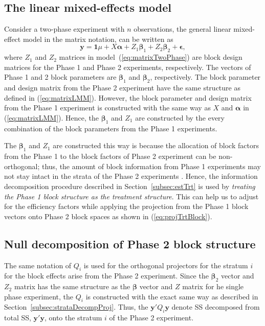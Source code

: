\documentclass[article]{jss}
\begin{document}
\subsection{The linear mixed-effects model}
\label{subsec:phase2Model}
Consider a two-phase experiment with $n$ observations, the general linear mixed-effect model in the matrix notation, can be written as
\begin{equation}
\label{eq:matrixTwoPhase}
\bm{y} = \bm{1}\mu + X\bm{\alpha} + Z_1\bm{\beta}_1 + Z_2\bm{\beta}_2 + \bm{\epsilon},
\end{equation}
where $Z_1$ and $Z_2$ matrices in model~(\ref{eq:matrixTwoPhase}) are block design matrices for the Phase 1 and Phase 2 experiments, respectively. The vectors of Phase 1 and 2 block parameters are $\bm{\beta}_1$ and $\bm{\beta}_2$, respectively. The block parameter and design matrix from the Phase 2 experiment have the same structure as defined in (\ref{eq:matrixLMM}). However, the block parameter and design matrix from the Phase 1 experiment is constructed with the same way as $X$ and $\bm{\alpha}$ in (\ref{eq:matrixLMM}). Hence, the $\bm{\beta}_1$ and $Z_1$ are constructed by the every combination of the block parameters from the Phase 1 experiments. 

The $\bm{\beta}_1$ and $Z_1$ are constructed this way is because the allocation of block factors from the Phase 1 to the block factors of Phase 2 experiment can be non-orthogonal; thus, the amount of block information from Phase 1 experiments may not stay intact in the strata of the Phase 2 experiments \citep{Brien1999}. Hence, the information decomposition procedure described in Section~\ref{subsec:estTrt} is used by \emph{treating the Phase 1 block structure as the treatment structure}. This can help us to adjust for the efficiency factors while applying the projection from the Phase 1 block vectors onto Phase 2 block spaces as shown in (\ref{eq:projTrtBlock}). 

\subsection{Null decomposition of Phase 2 block structure}
The same notation of $Q_i$ is used for the orthogonal projectors for the stratum $i$ for the block effects arise from the Phase 2 experiment. Since the $\bm{\beta}_2$ vector and $Z_2$ matrix has the same structure as the $\bm{\beta}$ vector and $Z$ matrix for he single phase experiment, the $Q_i$ is constructed with the exact same way as described in Section~\ref{subsec:strataDecompProj}. Thus, the $\bm{y}' Q_i \bm{y}$ denote SS decomposed from total SS, $\bm{y}'\bm{y}$, onto the stratum $i$ of the Phase 2 experiment.   
\end{document}
